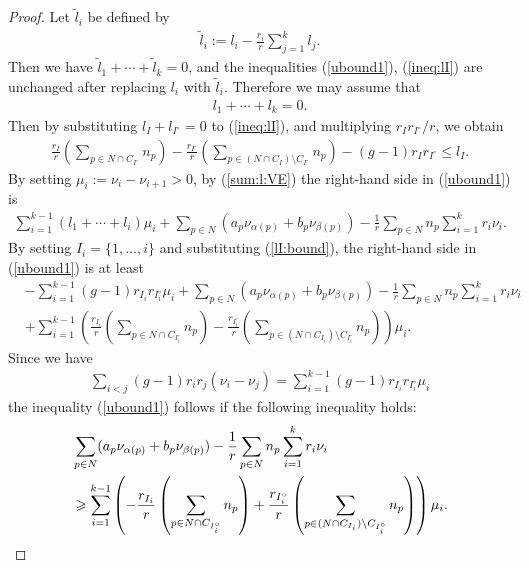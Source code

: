 \documentclass[11pt,oneside,a4paper,mathscr]{amsart}
\theoremstyle{definition}
\renewcommand{\leq}{\leqslant}
\renewcommand{\geq}{\geqslant}
\begin{document}
\begin{proof}
Let $\widetilde{l}_i$ be defined by 
\begin{align*}
    \widetilde{l}_i:=l_i -\frac{r_i}{r}\sum_{j=1}^k l_j.
\end{align*}
Then we have $\widetilde{l}_1+\cdots +\widetilde{l}_k=0$, and 
the inequalities (\ref{ubound1}), (\ref{ineq:lI}) are unchanged after replacing $l_i$ with $\widetilde{l}_i$. 
Therefore we may assume that 
\begin{align}\label{sum:l:VE}l_1+\cdots+l_k=0.
\end{align}
Then by substituting $l_{I}+l_{I^{\circ}}=0$ to (\ref{ineq:lI}), and multiplying $r_I r_{I^{\circ}}/r$,
we obtain 
\begin{align}\label{lI:bound}
    \frac{r_I}{r}\left(\sum_{p\in N \cap C_{I^{\circ}}}n_p  \right)-\frac{r_{I^{\circ}}}{r}
\left(\sum_{p\in (N\cap C_I)\setminus C_{I^{\circ}}}n_p  \right) -(g-1)r_I r_{I^{\circ}}\leq l_I.
\end{align}
By setting $\mu_i:=\nu_i-\nu_{i+1}>0$, by (\ref{sum:l:VE}) the right-hand side in (\ref{ubound1}) is 
\begin{align*}
\sum_{i=1}^{k-1}(l_1+\cdots+l_i)\mu_i+\sum_{p\in N}(a_p\nu_{\alpha(p)}+b_p\nu_{\beta(p)})-
\frac{1}{r}\sum_{p\in N}n_p 
  \sum_{i=1}^k r_i \nu_i. 
\end{align*}
By setting $I_i=\{1, \ldots, i\}$ and substituting (\ref{lI:bound}), the right-hand side in (\ref{ubound1}) is at least
\begin{align*}
   & -\sum_{i=1}^{k-1} (g-1)r_{I_i}r_{I_i^{\circ}} \mu_i+\sum_{p\in N}(a_p\nu_{\alpha(p)}+b_p\nu_{\beta(p)})-\frac{1}{r}\sum_{p\in N}n_p 
  \sum_{i=1}^k r_i \nu_i \\
&+\sum_{i=1}^{k-1}\left(\frac{r_{I_i}}{r}\left(\sum_{p\in N \cap C_{I_i^{\circ}}}n_p  \right) 
  -
    \frac{r_{I_i^{\circ}}}{r}\left(\sum_{p\in (N \cap C_{I_i})\setminus C_{I_i^{\circ}}}n_p\right)\right)\mu_i.
\end{align*}
Since we have 
\begin{align*}
        \sum_{i<j}(g-1)r_i r_j (\nu_i-\nu_j)= \sum_{i=1}^{k-1} (g-1)r_{I_i}r_{I_i^{\circ}} \mu_i
\end{align*}
the inequality (\ref{ubound1}) follows if the following inequality holds: 
\begin{align}\label{ineq:lambdap}
   & \sum_{p\in N}(a_p\nu_{\alpha(p)}+b_p\nu_{\beta(p)})-\frac{1}{r}\sum_{p\in N}n_p  
  \sum_{i=1}^k r_i \nu_i \\
&\notag \geq \sum_{i=1}^{k-1}\left(-\frac{r_{I_i}}{r}\left(\sum_{p\in N \cap C_{I_i^{\circ}}}n_p  \right) 
  +
    \frac{r_{I_i^{\circ}}}{r}\left(\sum_{p\in (N \cap C_{I_i})\setminus C_{I_i^{\circ}}}n_p\right)\right)\mu_i.
\end{align}


\end{proof}
\end{document}
